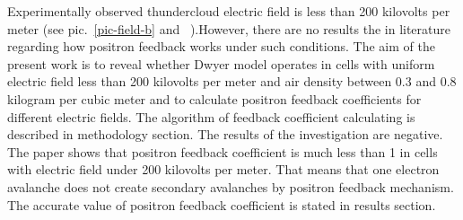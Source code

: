 \documentclass{webofc}
\begin{document}
    
    Experimentally observed thundercloud electric field is less than 200 kilovolts per meter (see pic.~\ref{pic-field-b} and ~\cite{mazin1989clouds, marshall1995electric}).However, there are no results the in literature regarding how positron feedback works under such conditions. The aim of the present work is to reveal whether Dwyer model operates in cells with uniform electric field less than 200 kilovolts per meter and air density between 0.3 and 0.8 kilogram per cubic meter and to calculate positron feedback coefficients for different electric fields. The algorithm of feedback coefficient calculating is described in methodology section.
    The results of the investigation are negative. The paper shows that positron feedback coefficient is much less than 1 in cells with electric field under 200 kilovolts per meter. That means that one electron avalanche does not create secondary avalanches by positron feedback mechanism. The accurate value of positron feedback coefficient is stated in results section.
    
\end{document}

